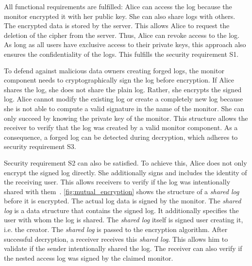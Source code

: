 \documentclass[../main.tex]{subfiles}
\begin{document}
All functional requirements are fulfilled:
Alice can access the log because the monitor encrypted it with her public key.
She can also share logs with others.
The encrypted data is stored by the server.
This allows Alice to request the deletion of the cipher from the server.
Thus, Alice can revoke access to the log.
As long as all users have exclusive access to their private keys, this approach also ensures the confidentiality of the logs.
This fulfills the security requirement S1.

To defend against malicious data owners creating forged logs, the monitor component needs to cryptographically sign the log before encryption.
If Alice shares the log, she does not share the plain log.
Rather, she encrypts the signed log.
Alice cannot modify the existing log or create a completely new log because she is not able to compute a valid signature in the name of the monitor.
She can only succeed by knowing the private key of the monitor.
This structure allows the receiver to verify that the log was created by a valid monitor component.
As a consequence, a forged log can be detected during decryption, which adheres to security requirement S3.

Security requirement S2 can also be satisfied.
To achieve this, Alice does not only encrypt the signed log directly.
She additionally signs and includes the identity of the receiving user.
This allows receivers to verify if the log was intentionally shared with them~\cite{Davis2001}.
\cref{fig:mutual_encryption} shows the structure of a \emph{shared log} before it is encrypted.
The actual log data is signed by the monitor.
The \emph{shared log} is a data structure that contains the signed log.
It additionally specifies the user with whom the log is shared.
The \emph{shared log} itself is signed user creating it, i.e. the creator.
The \emph{shared log} is passed to the encryption algorithm.
After successful decryption, a receiver receives this \emph{shared log}.
This allows him to validate if the sender intentionally shared the log.
The receiver can also verify if the nested access log was signed by the claimed monitor.
\end{document}
